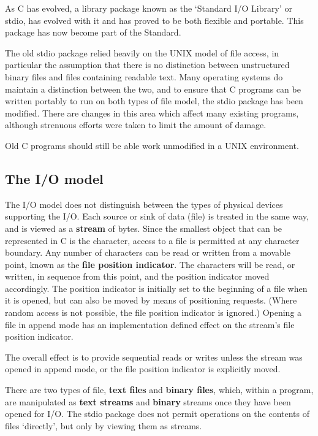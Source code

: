    As C has evolved, a library package known as the `Standard I/O
    Library' or stdio, has evolved with it and has proved to be both
    flexible and portable.  This package has now become part of the
    Standard.


   The old stdio package relied heavily on the UNIX model of file access, in
    particular the assumption that there is no distinction between unstructured
    binary files and files containing readable text.  Many operating systems do
    maintain a distinction between the two, and to ensure that C programs can
    be written portably to run on both types of file model, the stdio package
    has been modified.  There are changes in this area which affect many
    existing programs, although strenuous efforts were taken to limit the
    amount of damage.


   Old C programs should still be able work unmodified in a
    UNIX environment.


  

  \subsection{The I/O model}
   

   The I/O model does not distinguish between the types of physical devices
    supporting the I/O.  Each source or sink of data (file) is treated in the
    same way, and is viewed as a \textbf{stream} of bytes.  Since the
    smallest object that can be represented in C is the character, access to
    a file is permitted at any character boundary. Any number of characters can
    be read or written from a movable point, known as the \textbf{file position
    indicator}.  The characters will be read, or written, in sequence from
    this point, and the position indicator moved accordingly.  The position
    indicator is initially set to the beginning of a file when it is opened,
    but can also be moved by means of positioning requests.  (Where random
    access is not possible, the file position indicator is ignored.) Opening
    a file in append mode has an implementation defined effect on the stream's
    file position indicator.


   The overall effect is to provide sequential reads or writes unless the
    stream was opened in append mode, or the file position indicator is
    explicitly moved.


   There are two types of file, \textbf{text files} and \textbf{binary
    files}, which, within a program, are manipulated as \textbf{text
    streams} and \textbf{binary} streams once they have been opened for
    I/O.  The stdio package does not permit operations on the contents of files
    `directly', but only by viewing them as streams.


